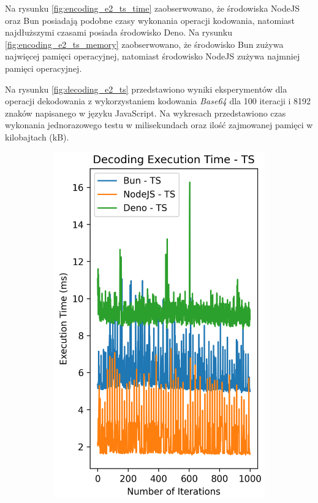 Na rysunku \ref{fig:encoding_e2_ts_time} zaobserwowano, że środowiska NodeJS oraz Bun posiadają podobne czasy wykonania operacji kodowania, natomiast najdłuższymi czasami posiada środowisko Deno. Na rysunku \ref{fig:encoding_e2_ts_memory} zaobserwowano, że środowisko Bun zużywa najwięcej pamięci operacyjnej, natomiast środowisko NodeJS zużywa najmniej pamięci operacyjnej.

Na rysunku \ref{fig:decoding_e2_ts} przedstawiono wyniki eksperymentów dla operacji dekodowania z wykorzystaniem kodowania \textit{Base64} dla 100 iteracji i 8192 znaków napisanego w języku JavaScript. Na wykresach przedstawiono czas wykonania jednorazowego testu w milisekundach oraz ilość zajmowanej pamięci w kilobajtach (kB).

\begin{figure}[H]
  \centering
  \begin{subfigure}[b]{0.44\textwidth}
    \centering
    \includegraphics[width=\textwidth]{Figures/coding/base64_1000_decoding_ts_time.png}

\end{subfigure}
\end{figure}
